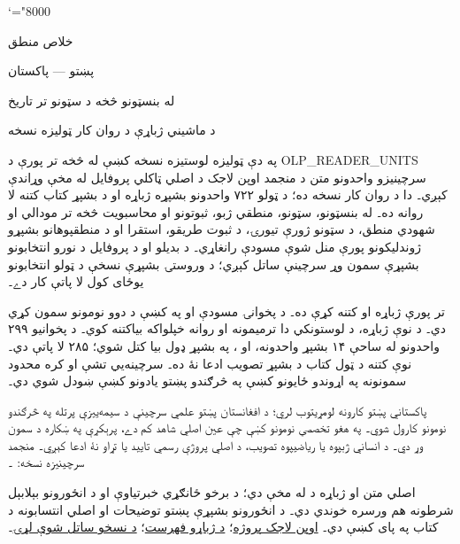 \documentclass[11pt,a4paper,oneside]{report}
\theoremstyle{definition}
\begin{document}
\setRTL
\mathcode`\!="8000
\begin{titlepage}
\thispagestyle{empty}
\begin{center}
\vspace*{22mm}
{\Huge خلاص منطق}\par\bigskip
{\Large پښتو — پاکستان}\par\bigskip
{\LARGE له بنسټونو څخه د سټونو تر تاريخ}\par\bigskip
د ماشيني ژباړې د روان کار ټوليزه نسخه
\end{center}
\bigskip
\small
په دې ټوليزه لوستيزه نسخه کښې له  څخه تر
 پورې د OLP_READER_UNITS سرچينيزو واحدونو متن د
منجمد اوپن لاجک د اصلي ټاکلي پروفايل له مخې وړاندې کېږي۔ دا د روان کار
نسخه ده؛ د ټولو ۷۲۲ واحدونو بشپړه ژباړه او د بشپړ کتاب کتنه لا روانه ده۔
له بنسټونو، سټونو، منطقي ژبو، ثبوتونو او محاسبويت څخه تر مودالي او
شهودي منطق، د سټونو ژورې تيورۍ، د ثبوت طريقو، استقرا او د منطقپوهانو
بشپړو ژوندليکونو پورې منل شوې مسودې رانغاړي۔ د بديلو او د پروفايل
د نورو انتخابونو بشپړې سمون وړ سرچينې ساتل کېږي؛ د وروستۍ بشپړې نسخې
د ټولو انتخابونو يوځای کول لا پاتې کار دے۔

تر  پورې ژباړه او کتنه
 کړې ده۔
د  پخوانۍ مسودې او په
 کښې د دوو نومونو سمون
 کړي دي۔
د  نوې ژباړه، د لوستونکي دا ترميمونه
او روانه خپلواکه بياکتنه 
کوي۔ د پخوانيو ۲۹۹ واحدونو له ساحې ۱۴ بشپړ واحدونه،
 او ، په بشپړ
ډول بيا کتل شوي؛ ۲۸۵ لا پاتې دي۔ نوې کتنه د ټول کتاب د بشپړ
تصويب ادعا نۀ ده۔ سرچينه‌يي تشې او کره محدود سمونونه په اړوندو
ځايونو کښې په څرګندو پښتو يادونو کښې ښودل شوي دي۔

پاکستاني پښتو کارونه لومړيتوب لري؛ د افغانستان پښتو علمي سرچينې
د سيمه‌ييزې پرتله په څرګندو نومونو کارول شوي۔ په هغو تخصصي نومونو
کښې چې عين اصلي شاهد کم دے، پرېکړې په ښکاره د سمون وړ دي۔
د انساني ژبپوه يا رياضيپوه تصويب، د اصلي پروژې رسمي تاييد يا تړاو
نۀ ادعا کېږي۔ منجمد سرچينيزه نسخه:
۔

اصلي متن او ژباړه د \href{https://creativecommons.org/licenses/by/4.0/}{}
له مخې دي؛ د برخو ځانګړي خبرتياوې او د انځورونو بېلابېل شرطونه
هم ورسره خوندي دي۔ د انځورونو بشپړې پښتو توضيحات او اصلي
انتسابونه د کتاب په پای کښې دي۔
\href{https://openlogicproject.org/}{اوپن لاجک پروژه}؛
\href{https://github.com/KokunoYumeto/OpenLogic-translations}{د ژباړو فهرست}؛
\href{https://doi.org/10.5281/zenodo.22307197}{د نسخو ساتل شوې لړۍ}۔

\end{titlepage}
\tableofcontents
\clearpage
\end{document}
